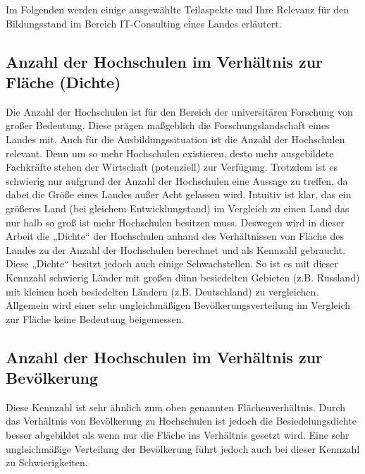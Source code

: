 Im Folgenden werden einige ausgewählte Teilaspekte und Ihre Relevanz für den Bildungsstand im Bereich IT-Consulting eines Landes erläutert.

\subsection{Anzahl der Hochschulen im Verhältnis zur Fläche (Dichte)}
Die Anzahl der Hochschulen ist für den Bereich der universitären Forschung von großer Bedeutung. Diese prägen maßgeblich die Forschungslandschaft eines Landes mit. Auch für die Ausbildungssituation ist die Anzahl der Hochschulen relevant. Denn um so mehr Hochschulen existieren, desto mehr ausgebildete Fachkräfte stehen der Wirtschaft (potenziell) zur Verfügung. 
Trotzdem ist es schwierig nur aufgrund der Anzahl der Hochschulen eine Aussage zu treffen, da dabei die Größe eines Landes außer Acht gelassen wird. Intuitiv ist klar, das ein größeres Land (bei gleichem Entwicklungstand) im Vergleich zu einen Land das nur halb so groß ist mehr Hochschulen besitzen muss. Deswegen wird in dieser Arbeit die „Dichte“ der Hochschulen anhand des Verhältnissen von  Fläche des Landes zu der Anzahl der Hochschulen berechnet und als Kennzahl gebraucht.
Diese „Dichte“ besitzt jedoch auch einige Schwachstellen. So ist es mit dieser Kennzahl schwierig Länder mit großen dünn besiedelten Gebieten (z.B. Russland) mit kleinen hoch besiedelten Ländern (z.B. Deutschland) zu vergleichen. Allgemein wird einer sehr ungleichmäßigen Bevölkerungsverteilung im Vergleich zur Fläche keine Bedeutung beigemessen.

\subsection{Anzahl der Hochschulen im Verhältnis zur Bevölkerung}
Diese Kennzahl ist sehr ähnlich zum oben genannten Flächenverhältnis. Durch das Verhältnis von Bevölkerung zu Hochschulen ist jedoch die Besiedelungsdichte besser abgebildet als wenn nur die Fläche ins Verhältnis gesetzt wird.
Eine sehr ungleichmäßige Verteilung der Bevölkerung führt jedoch auch bei dieser Kennzahl zu Schwierigkeiten.

